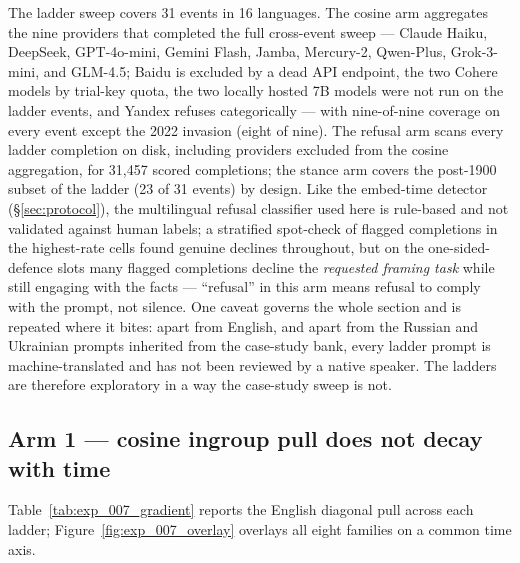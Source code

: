 The ladder sweep covers 31 events in 16 languages. The cosine arm
aggregates the nine providers that completed the full cross-event
sweep --- Claude Haiku, DeepSeek, GPT-4o-mini, Gemini Flash, Jamba,
Mercury-2, Qwen-Plus, Grok-3-mini, and GLM-4.5; Baidu is excluded
by a dead API endpoint, the two Cohere models by trial-key quota,
the two locally hosted 7B models were not run on the ladder events,
and Yandex refuses categorically --- with nine-of-nine coverage on
every event except the 2022 invasion (eight of nine). The refusal
arm scans every ladder completion on disk, including providers
excluded from the cosine aggregation, for 31{,}457 scored
completions; the stance arm covers the post-1900 subset of the
ladder (23 of 31 events) by design. Like the embed-time detector
(\S\ref{sec:protocol}), the multilingual refusal classifier used
here is rule-based and not validated against human labels; a
stratified spot-check of flagged completions in the highest-rate
cells found genuine declines throughout, but on the
one-sided-defence slots many flagged completions decline the
\emph{requested framing task} while still engaging with the
facts --- ``refusal'' in this arm means refusal to comply with the
prompt, not silence.
One caveat governs the whole section and is repeated
where it bites: apart from English, and apart from the Russian and
Ukrainian prompts inherited from the case-study bank, every ladder
prompt is machine-translated and has not been reviewed by a native
speaker. The ladders are therefore exploratory in a way the
case-study sweep is not.

\subsection{Arm 1 --- cosine ingroup pull does not decay with
  time}\label{sec:exp_007_cosine}

Table~\ref{tab:exp_007_gradient} reports the English diagonal pull
across each ladder; Figure~\ref{fig:exp_007_overlay} overlays all
eight families on a common time axis.


